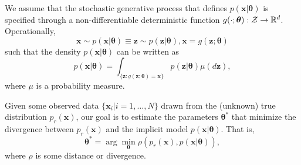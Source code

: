 \documentclass[twocolumn,superscriptaddress,aps]{revtex4-1}
\newcommand{\bftheta}{{\bm \theta}}
\newcommand{\bfx}{\mathbf{x}}
\newcommand{\bfz}{\mathbf{z}}
\theoremstyle{plain}
\begin{document}
We assume that the stochastic generative process that defines $p(\mathbf{x}|\bftheta)$ is
specified through a non-differentiable deterministic function $g(\cdot; \bftheta) : {\cal Z} \to
\mathbb{R}^d$. Operationally, %
\begin{equation}\label{eqn:p_theta}
    \mathbf{x} \sim p(\mathbf{x}|\bftheta) \equiv \bfz \sim p(\bfz|\bftheta), \mathbf{x} = g(\bfz; \bftheta)
\end{equation}
such that the density $p(\mathbf{x}|\bftheta)$ can be
written as
\begin{equation}\label{eqn:p_x_sim}
    p(\mathbf{x}|\bftheta) = \int_{\{\bfz:g(\bfz;\bftheta) = \bfx \}} p(\bfz|\bftheta) \mu(d\bfz),
\end{equation}
where $\mu$ is a probability measure.

Given some observed data $\{ \mathbf{x}_i | i=1, \dots, N \}$ drawn from the
(unknown) true distribution $p_r(\mathbf{x})$, our goal is to estimate the parameters
$\bftheta^*$ that minimize the divergence between $p_r(\mathbf{x})$ and
the implicit model $p(\mathbf{x}|\bftheta)$. That is,
\begin{equation}
    \bftheta^* = \arg \min_{\bftheta} \rho(p_r(\mathbf{x}), p(\mathbf{x}|\bftheta)),
\end{equation}
where $\rho$ is some distance or divergence.


\end{document}

